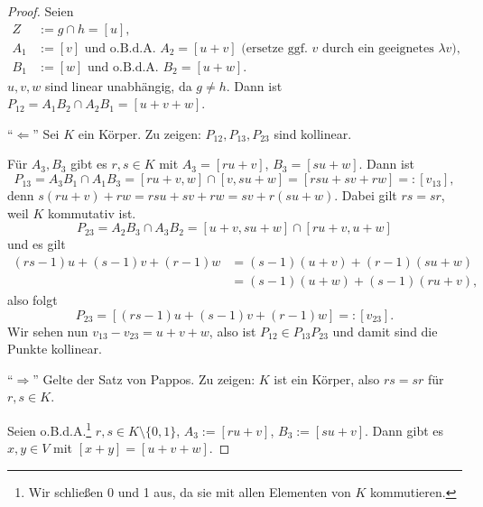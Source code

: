 \documentclass[
 a4paper,
 12pt,
 parskip=half
 ]{scrartcl}
\theoremstyle{plain}
\theoremstyle{definition}
\begin{document}
\begin{proof}
 Seien 
 \[ \begin{aligned}
     Z   &:= g \cap h = [u], \\
     A_1 &:= [v] \text{ und o.B.d.A. } A_2 = [u + v] \text{ (ersetze ggf. $v$ durch ein geeignetes $\lambda v$)}, \\
     B_1 &:= [w] \text{ und o.B.d.A. } B_2 = [u + w].
    \end{aligned} \]
 $u, v, w$ sind linear unabhängig, da $g \ne h$. Dann ist $P_{12} = A_1 B_2 \cap A_2 B_1 = [u + v + w]$. 
 
 ``$\Leftarrow$'' Sei $K$ ein Körper. Zu zeigen: $P_{12}, P_{13}, P_{23}$ sind kollinear.
 
 Für $A_3, B_3$ gibt es $r, s \in K$ mit $A_3 = [ru+v]$, $B_3 = [su+w]$. Dann ist 
 \[ P_{13} = A_3 B_1 \cap A_1 B_3 = [ru + v, w] \cap [v, su + w] = [rsu+sv+rw] =: [v_{13}], \]
 denn $s(ru+v) + rw = rsu + sv + rw = sv + r(su + w)$. Dabei gilt $rs = sr$, weil $K$ kommutativ ist.
 \[ P_{23} = A_2 B_3 \cap A_3 B_2 = [u+v, su + w] \cap [ru + v, u+w] \]
 und es gilt
 \[ \begin{aligned}
    (rs-1)u + (s-1)v + (r-1)w 
    &= (s-1) (u+v) + (r-1)(su +w) \\
    &= (s-1)(u+w) + (s-1)(ru+v),
    \end{aligned} \]
 also folgt
 \[ P_{23} = [ (rs-1)u + (s-1)v + (r-1)w ] =: [v_{23}]. \]
 Wir sehen nun $v_{13} - v_{23} = u + v + w$, also ist $P_{12} \in P_{13} P_{23}$ und damit sind die Punkte kollinear.
 
 ``$\Rightarrow$'' Gelte der Satz von Pappos. Zu zeigen: $K$ ist ein Körper, also $rs = sr$ für $r,s \in K$.
 
 Seien o.B.d.A.\footnote{Wir schließen 0 und 1 aus, da sie mit allen Elementen von $K$ kommutieren.} $r,s \in K \setminus \{ 0, 1 \}$, $A_3 := [ru+v]$, $B_3 := [su+v]$. Dann gibt es $x,y \in V$ mit $[x+y] = [u + v + w]$.
 

\end{proof}
\end{document}
